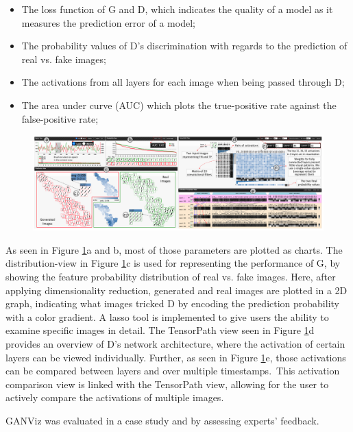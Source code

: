 \documentclass{acmsiggraph}               %
\begin{document}
\begin{itemize}
  \item The loss function of G and D, which indicates the quality of a model as it measures the prediction error of a model;
  \item The probability values of D's discrimination with regards to the prediction of real vs. fake images;
  \item The activations from all layers for each image when being passed through D;
  \item The area under curve (AUC) which plots the true-positive rate against the false-positive rate;
\end{itemize}

\begin{figure}
  \centering
  \includegraphics[width=\textwidth]{ganviz}
  \caption{\protect\cite{Wang}}
  \label{fig:ganviz}
\end{figure}

As seen in Figure \ref{fig:ganviz}a and b, most of those parameters are plotted as charts. The distribution-view in Figure \ref{fig:ganviz}c is used for representing the performance of G, by showing the feature probability distribution of real vs. fake images. Here, after applying dimensionality reduction, generated and real images are plotted in a 2D graph, indicating what images tricked D by encoding the prediction probability with a color gradient. A lasso tool is implemented to give users the ability to examine specific images in detail. The TensorPath view seen in Figure \ref{fig:ganviz}d provides an overview of D's network architecture, where the activation of certain layers can be viewed individually. Further, as seen in Figure \ref{fig:ganviz}e, those activations can be compared between layers and over multiple timestamps. This activation comparison view is linked with the TensorPath view, allowing for the user to actively compare the activations of multiple images.

GANViz was evaluated in a case study and by assessing experts' feedback.
\end{document}
